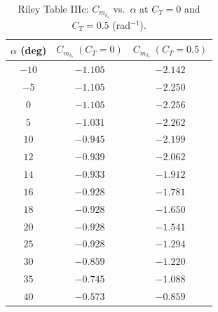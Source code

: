 \documentclass[journal ]{new-aiaa}
\begin{document}
\begin{table}[H]
\centering
\caption{Riley Table IIIc: $C_{m_{\delta_e}}$ vs.\ $\alpha$ at $C_T = 0$ and $C_T = 0.5$ (rad$^{-1}$).}
\label{tab:riley_cmde}
\begin{tabular}{ccc}
\toprule
$\alpha$ (deg) & $C_{m_{\delta_e}}\ (C_T{=}0)$ & $C_{m_{\delta_e}}\ (C_T{=}0.5)$ \\
\midrule
$-10$ & $-1.105$ & $-2.142$ \\
$-5$  & $-1.105$ & $-2.250$ \\
$ 0$  & $-1.105$ & $-2.256$ \\
$ 5$  & $-1.031$ & $-2.262$ \\
$10$  & $-0.945$ & $-2.199$ \\
$12$  & $-0.939$ & $-2.062$ \\
$14$  & $-0.933$ & $-1.912$ \\
$16$  & $-0.928$ & $-1.781$ \\
$18$  & $-0.928$ & $-1.650$ \\
$20$  & $-0.928$ & $-1.541$ \\
$25$  & $-0.928$ & $-1.294$ \\
$30$  & $-0.859$ & $-1.220$ \\
$35$  & $-0.745$ & $-1.088$ \\
$40$  & $-0.573$ & $-0.859$ \\
\bottomrule
\end{tabular}
\end{table}


\end{document}
